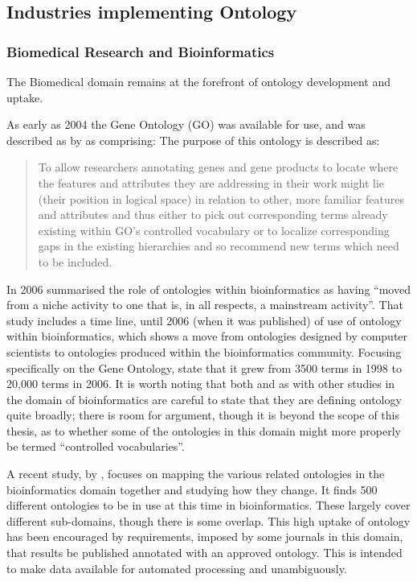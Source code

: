 \subsection{Industries implementing Ontology}
\subsubsection{Biomedical Research and Bioinformatics}
\label{sec:biomedical}
The Biomedical domain remains at the forefront of ontology development and uptake.

As early as 2004 the Gene Ontology (GO) was available for use, and was described as by \citet{Smith2004} as comprising:  The purpose of this ontology is described as: 
\begin{quote}
To allow researchers annotating genes and gene products to locate where the features and attributes they are addressing in their work might lie (their position in logical space) in relation to other, more familiar features and attributes and thus either to pick out corresponding terms already existing within GO’s controlled vocabulary or to localize corresponding gaps in the existing hierarchies and so recommend new terms which need to be included.
\end{quote}
In 2006 \citet{Bodenreider2006} summarised the role of ontologies within bioinformatics as having ``moved from a niche activity to one that is, in all respects, a mainstream activity''. That study includes a time line, until 2006 (when it was published) of use of ontology within bioinformatics, which shows a move from ontologies designed by computer scientists to ontologies produced within the bioinformatics community. Focusing specifically on the Gene Ontology, \citet{Bodenreider2006} state that it grew from 3500 terms in 1998 to 20,000 terms in 2006. It is worth noting that both \citet{Bodenreider2006} and \citet{Gro2016} as with other studies in the domain of bioinformatics are careful to state that they are defining ontology quite broadly; there is room for argument, though it is beyond the scope of this thesis, as to whether some of the ontologies in this domain might more properly be termed ``controlled vocabularies''.

A recent study, by \citet{Gro2016}, focuses on mapping the various related ontologies in the bioinformatics domain together and studying how they change. It finds 500 different ontologies to be in use at this time in bioinformatics. These largely cover different sub-domains, though there is some overlap. This high uptake of ontology has been encouraged by requirements, imposed by some journals in this domain, that results be published annotated with an approved ontology. This is intended to make data available for automated processing and unambiguously.

